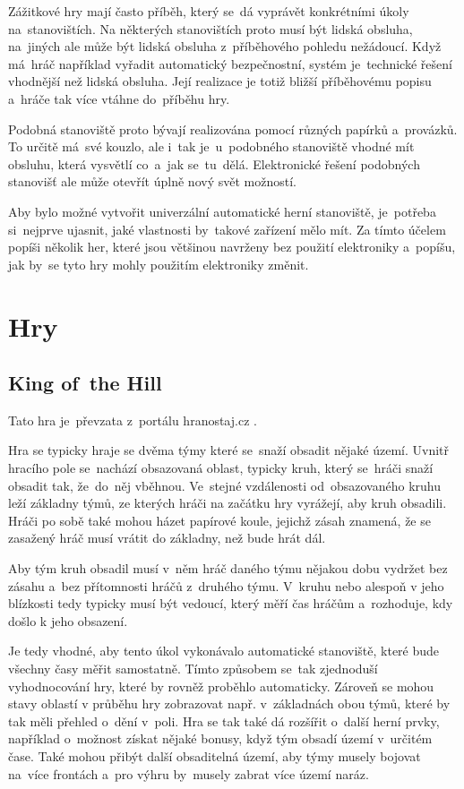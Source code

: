 Zážitkové hry mají často příběh, který se~dá vyprávět konkrétními úkoly na~stanovištích.
Na některých stanovištích proto musí být lidská obsluha, na~jiných ale může být lidská obsluha z~příběhového pohledu nežádoucí.
Když má~hráč například vyřadit automatický bezpečnostní, systém je~technické řešení vhodnější než lidská obsluha. %
Její realizace je totiž bližší příběhovému popisu a~hráče tak více vtáhne do~příběhu hry.

Podobná stanoviště proto bývají realizována pomocí různých papírků a~provázků.
To určitě má~své kouzlo, ale i~tak je~u~podobného stanoviště vhodné mít obsluhu, která vysvětlí co~a~jak se~tu~dělá.
Elektronické řešení podobných stanovišť ale může otevřít úplně nový svět možností.

Aby bylo možné vytvořit univerzální automatické herní stanoviště, je~potřeba si~nejprve ujasnit, jaké vlastnosti by~takové zařízení mělo mít.
Za tímto účelem popíši několik her, které jsou většinou navrženy bez použití elektroniky a~popíšu, jak by~se tyto hry mohly použitím elektroniky změnit.

\vspace{-3mm}
\section{Hry}
\vspace{-2mm}
\subsection{King of~the Hill \label{KOTH} }
Tato hra je~převzata z~portálu hranostaj.cz \cite{KingOfTheHill}.

Hra se typicky hraje se dvěma týmy které se~snaží obsadit nějaké území.
Uvnitř hracího pole se~nachází obsazovaná oblast, typicky kruh, který se~hráči snaží obsadit tak, že~do~něj vběhnou.
Ve~stejné vzdálenosti od~obsazovaného kruhu leží základny týmů, ze kterých hráči na začátku hry vyrážejí, aby kruh obsadili. 
Hráči po sobě také mohou házet papírové koule, jejichž zásah znamená, že se zasažený hráč musí vrátit do základny, než bude hrát dál.

Aby tým kruh obsadil musí v~něm hráč daného týmu nějakou dobu vydržet bez zásahu a~bez přítomnosti hráčů z~druhého týmu.
V~kruhu nebo alespoň v jeho blízkosti tedy typicky musí být vedoucí, který měří čas hráčům a~rozhoduje, kdy došlo k jeho obsazení.

Je tedy vhodné, aby tento úkol vykonávalo automatické stanoviště, které bude všechny časy měřit samostatně.
Tímto způsobem se~tak zjednoduší vyhodnocování hry, které by rovněž proběhlo automaticky.
Zároveň se mohou stavy oblastí v průběhu hry zobrazovat např. v~základnách obou týmů, které by tak měli přehled o~dění v~poli.
Hra se tak také dá rozšířit o~další herní prvky, například o~možnost získat nějaké bonusy, když tým obsadí území v~určitém čase.
Také mohou přibýt další obsaditelná území, aby týmy musely bojovat na~více frontách a~pro výhru by~musely zabrat více území naráz.

